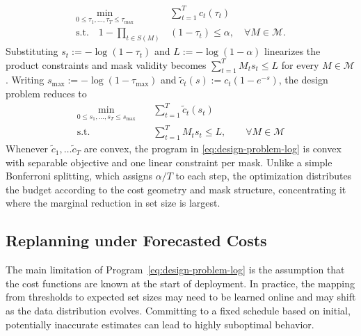 \documentclass{uai2026} %
\newcommand{\1}{\mathbf{1}}
\newcommand{\mcal}{\mathcal{M}}
\begin{document}
\begin{equation}
  \label{eq:design-problem}
  \begin{aligned}
    \min_{0 \le \tau_{1},\dots,\tau_{T}\le \tau_{\max}}\quad & \sum_{t=1}^{T} c_t(\tau_t)\\
    \text{s.t.}\quad  1-\prod_{t\in S(M)}&(1-\tau_t)\le \alpha,\quad \forall M\in\mcal.
  \end{aligned}
\end{equation}
Substituting $s_t := -\log(1-\tau_t)$ and $L := -\log(1-\alpha)$ linearizes the product constraints and mask validity becomes $\sum_{t=1}^{T} M_t s_t \le L$ for every $M \in \mcal$.
Writing $s_{\max} := -\log(1-\tau_{\max})$ and $\tilde{c}_t(s) := c_t(1 - e^{-s})$, the design problem reduces to
\begin{equation}
  \label{eq:design-problem-log}
  \begin{aligned}
    \min_{0 \le s_{1},\dots,s_{T}\le s_{\max}}\quad & \sum_{t=1}^{T} \tilde{c}_t(s_t)\\
    \text{s.t.}\quad & \sum_{t=1}^{T} M_t s_t \le L,\qquad \forall M\in\mcal
  \end{aligned}
\end{equation}
Whenever $\tilde{c}_1,\ldots\tilde{c}_T$ are convex, the program in \ref{eq:design-problem-log} is convex with separable objective and one linear constraint per mask.
Unlike a simple Bonferroni splitting, which assigns $\alpha/T$ to each step, the optimization distributes the budget according to the cost geometry and mask structure, concentrating it where the marginal reduction in set size is largest.

\subsection{Replanning under Forecasted Costs}
\label{sec:replanning}

The main limitation of Program~\eqref{eq:design-problem-log} is the assumption that the cost functions are known at the start of deployment. In practice, the mapping from thresholds to expected set sizes may need to be learned online and may shift as the data distribution evolves. Committing to a fixed schedule based on initial, potentially inaccurate estimates can lead to highly suboptimal behavior.
\end{document}
